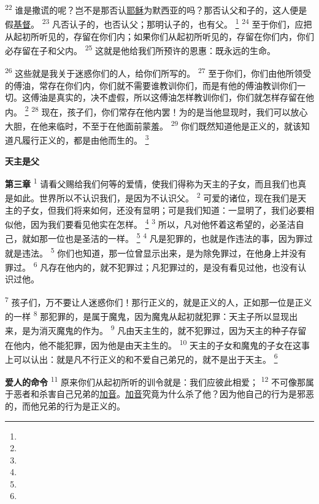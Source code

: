 \begin{multicols}{2}
\textsuperscript{22}
谁是撒谎的呢？岂不是那否认\uline{耶稣}为默西亚的吗？那否认父和子的，这人便是假\uline{基督}。
\textsuperscript{23}
凡否认子的，也否认父；那明认子的，也有父。
\footnote{}
\textsuperscript{24}
至于你们，应把从起初所听见的，存留在你们内；如果你们从起初所听见的，存留在你们内，你们必存留在子和父内。
\textsuperscript{25}
这就是他给我们所预许的恩惠：既永远的生命。

\textsuperscript{26}
这些就是我关于迷惑你们的人，给你们所写的。
\textsuperscript{27}
至于你们，你们由他所领受的傅油，常存在你们内，你们就不需要谁教训你们，而是有他的傅油教训你们一切。这傅油是真实的，决不虚假，所以这傅油怎样教训你们，你们就怎样存留在他内。
\footnote{}
\textsuperscript{28}
现在，孩子们，你们常存在他内罢！为的是当他显现时，我们可以放心大胆，在他来临时，不至于在他面前蒙羞。
\textsuperscript{29}
你们既然知道他是正义的，就该知道凡履行正义的，都是由他而生的。
\footnote{}

\begin{center}
	\textbf{\large{\songti 天主是父}}
\end{center}

\textbf{第三章\quad}
\textsuperscript{1}
请看父赐给我们何等的爱情，使我们得称为天主的子女，而且我们也真是如此。世界所以不认识我们，是因为不认识父。
\textsuperscript{2}
可爱的诸位，现在我们是天主的子女，但我们将来如何，还没有显明；可是我们知道：一显明了，我们必要相似他，因为我们要看见他实在怎样。
\footnote{}
\textsuperscript{3}
所以，凡对他怀着这希望的，必圣洁自己，就如那一位也是圣洁的一样。
\footnote{}
\textsuperscript{4}
凡是犯罪的，也就是作违法的事，因为罪过就是违法。
\textsuperscript{5}
你们也知道，那一位曾显示出来，是为除免罪过，在他身上并没有罪过。
\textsuperscript{6}
凡存在他内的，就不犯罪过；凡犯罪过的，是没有看见过他，也没有认识过他。

\textsuperscript{7}
孩子们，万不要让人迷惑你们！那行正义的，就是正义的人，正如那一位是正义的一样
\textsuperscript{8}
那犯罪的，是属于魔鬼，因为魔鬼从起初就犯罪：天主子所以显现出来，是为消灭魔鬼的作为。
\textsuperscript{9}
凡由天主生的，就不犯罪过，因为天主的种子存留在他内，他不能犯罪，因为他是由天主生的。
\textsuperscript{10}
天主的子女和魔鬼的子女在这事上可以认出：就是凡不行正义的和不爱自己弟兄的，就不是出于天主。
\footnote{}

\textbf{爱人的命令\quad}
\textsuperscript{11}
原来你们从起初所听的训令就是：我们应彼此相爱；
\textsuperscript{12}
不可像那属于恶者和杀害自己兄弟的\uline{加音}。\uline{加音}究竟为什么杀了他？因为他自己的行为是邪恶的，而他兄弟的行为是正义的。


\end{multicols}

